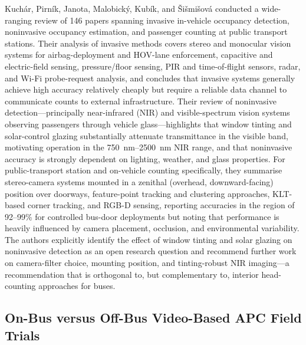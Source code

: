 \documentclass[12pt,a4paper]{report}
\begin{document}
Kuchár, Pirník, Janota, Malobický, Kubík, and Šišmišová conducted a wide-ranging review of 146 papers spanning invasive in-vehicle occupancy detection, noninvasive occupancy estimation, and passenger counting at public transport stations. Their analysis of invasive methods covers stereo and monocular vision systems for airbag-deployment and HOV-lane enforcement, capacitive and electric-field sensing, pressure/floor sensing, PIR and time-of-flight sensors, radar, and Wi-Fi probe-request analysis, and concludes that invasive systems generally achieve high accuracy relatively cheaply but require a reliable data channel to communicate counts to external infrastructure. Their review of noninvasive detection---principally near-infrared (NIR) and visible-spectrum vision systems observing passengers through vehicle glass---highlights that window tinting and solar-control glazing substantially attenuate transmittance in the visible band, motivating operation in the 750~nm--2500~nm NIR range, and that noninvasive accuracy is strongly dependent on lighting, weather, and glass properties. For public-transport station and on-vehicle counting specifically, they summarise stereo-camera systems mounted in a zenithal (overhead, downward-facing) position over doorways, feature-point tracking and clustering approaches, KLT-based corner tracking, and RGB-D sensing, reporting accuracies in the region of 92--99\% for controlled bus-door deployments but noting that performance is heavily influenced by camera placement, occlusion, and environmental variability. The authors explicitly identify the effect of window tinting and solar glazing on noninvasive detection as an open research question and recommend further work on camera-filter choice, mounting position, and tinting-robust NIR imaging---a recommendation that is orthogonal to, but complementary to, interior head-counting approaches for buses.

\subsection{On-Bus versus Off-Bus Video-Based APC Field Trials}
\end{document}
